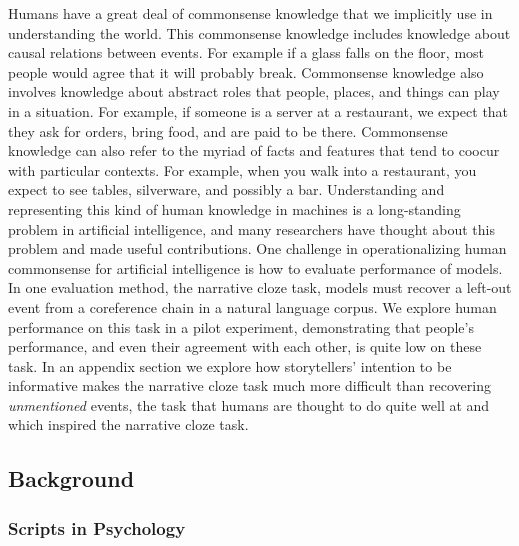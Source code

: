 \documentclass[10pt,a4paper]{article}
\begin{document}
Humans have a great deal of commonsense knowledge that we implicitly use in understanding the world.
This commonsense knowledge includes knowledge about causal relations between events.
For example if a glass falls on the floor, most people would agree that it will probably break.
Commonsense knowledge also involves knowledge about abstract roles that people, places, and things can play in a situation.
For example, if someone is a server at a restaurant, we expect that they ask for orders, bring food, and are paid to be there.
Commonsense knowledge can also refer to the myriad of facts and features that tend to coocur with particular contexts.
For example, when you walk into a restaurant, you expect to see tables, silverware, and possibly a bar.
Understanding and representing this kind of human knowledge in machines is a long-standing problem in artificial intelligence, and many researchers have thought about this problem and made useful contributions.
One challenge in operationalizing human commonsense for artificial intelligence is how to evaluate performance of models. In one evaluation method, the narrative cloze task, models must recover a left-out event from a coreference chain in a natural language corpus.
We explore human performance on this task in a pilot experiment, demonstrating that people's performance, and even their agreement with each other, is quite low on these task.
In an appendix section we explore how storytellers' intention to be informative makes the narrative cloze task much more difficult than recovering {\em unmentioned} events, the task that humans are thought to do quite well at and which inspired the narrative cloze task.

\subsection{Background}

\subsubsection{Scripts in Psychology}
\end{document}
